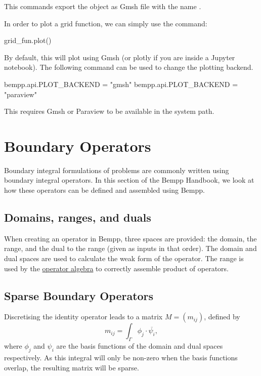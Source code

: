 \documentclass[a4paper]{book}
\begin{document}
This commands export the object  as Gmsh file with the
name .

In order to plot a grid function, we can simply use the command:

\begin{python}
grid_fun.plot()
\end{python}

By default, this will plot using Gmsh (or plotly if you are inside a Jupyter notebook).
The following command can be used to change the plotting backend.

\begin{python}
bempp.api.PLOT_BACKEND = "gmsh"
bempp.api.PLOT_BACKEND = "paraview"
\end{python}

This requires Gmsh or Paraview to be available in the system path.


\chapter{Boundary Operators}


Boundary integral formulations of problems are commonly written using boundary integral operators.
In this section of the Bempp Handbook, we look at how these operators can be defined and
assembled using Bempp.

\section{ Domains, ranges, and duals}When creating an operator in Bempp, three spaces are provided: the domain, the range, and the
dual to the range (given as inputs in that order). The domain and dual spaces are used to
calculate the weak form of the operator. The range is used by the
\href{operator_algebra.md}{operator algebra} to correctly assemble product of operators.


\section{Sparse Boundary Operators}

Discretising the identity operator leads to a matrix $M=(m_{ij})$, defined by
\[m_{ij}=\int_\Gamma\phi_j\cdot\overline{\psi_i},\]
where $\phi_j$ and $\psi_i$ are the basis functions of the domain and dual spaces respectively.
As this integral will only be non-zero when the basis functions overlap, the resulting
matrix will be sparse.
\end{document}
